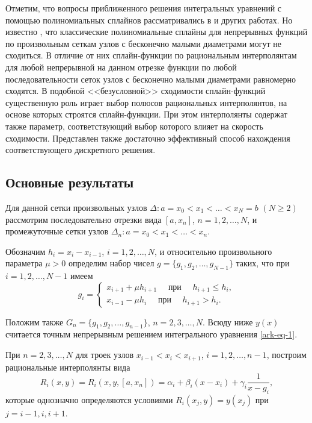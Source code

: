 Отметим, что вопросы приближенного решения интегральных уравнений с помощью полиномиальных
сплайнов рассматривались в \cite{ark-4,ark-5,ark-6,ark-7} и других работах. Но известно
\cite{ark-7, ark-8}, что классические полиномиальные сплайны для непрерывных функций
по произвольным сеткам узлов с бесконечно малыми диаметрами могут не сходиться.
В отличие от них сплайн-функции по рациональным интерполянтам \cite{ark-9} для любой непрерывной
на данном отрезке функции по любой последовательности сеток узлов с бесконечно малыми диаметрами
равномерно сходятся. В подобной <<безусловной>> сходимости сплайн-функций существенную роль
играет выбор полюсов рациональных интерполянтов, на основе которых строятся сплайн-функции.
При этом интерполянты содержат также параметр, соответствующий выбор которого
влияет на скорость сходимости. Представлен также достаточно эффективный способ нахождения
соответствующего дискретного решения.


\subsection{Основные результаты}
Для данной сетки произвольных узлов $\Delta: a=x_0<x_1<\dots <x_N=b$ $(N\geqslant 2)$
рассмотрим последовательно отрезки вида $[a,x_n]$, $n=1,2,\dots,N$, и промежуточные
сетки узлов $\Delta_n: a=x_0<x_1<\dots<x_n$.

Обозначим $h_i=x_i-x_{i-1}$, $i=1,2,\dots,N$, и относительно произвольного параметра
$\mu>0$ определим набор чисел $g=\{g_1,g_2,\dots,g_{N-1}\}$ таких, что при $i=1,2,\dots,N-1$
имеем
\begin{equation}\label{ark-eq-1.1}
g_i=\begin{cases}
x_{i+1}+\mu h_{i+1} \quad\text{ при }\quad h_{i+1}\leqslant h_i,\\
x_{i-1}-\mu h_i \quad \text{ при }\quad h_{i+1}> h_i.
\end{cases}
\end{equation}

Положим также $G_n=\{g_1,g_2,\dots,g_{n-1}\}$, $n=2,3,\dots,N$.
Всюду ниже $y(x)$ считается точным непрерывным решением интегрального уравнения \eqref{ark-eq-1}.

При $n=2,3,\dots,N$ для троек узлов $x_{i-1}<x_i<x_{i+1}$, $i=1,2,\dots,n-1$,
построим рациональные интерполянты вида
\begin{equation}\label{ark-eq-1.2}
R_i(x,y)=R_i(x,y,[a,x_n])=\alpha_i+\beta_i(x-x_i)+\gamma_i \frac 1{x-g_i},
\end{equation}
которые однозначно определяются условиями $R_i(x_j,y)=y(x_j)$ при $j=i-1,i,i+1$.

